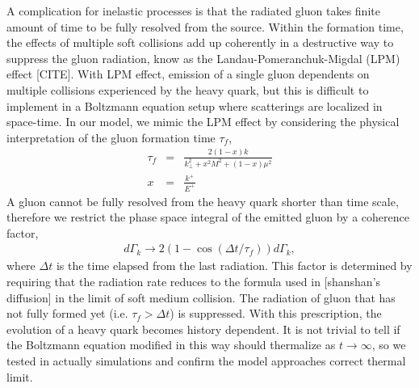 \documentclass[aps, prc, reprint, amsmath, groupedaddress, nofootinbib]{revtex4-1}
\begin{document}
A complication for inelastic processes is that the radiated gluon takes finite amount of time to be fully resolved from the source. 
Within the formation time, the effects of multiple soft collisions add up  coherently in a destructive way to suppress the gluon radiation, know as the Landau-Pomeranchuk-Migdal (LPM) effect [CITE].
With LPM effect, emission of a single gluon dependents on multiple collisions experienced by the heavy quark, but this is difficult to implement in a Boltzmann equation setup where scatterings are localized in space-time.
In our model, we mimic the LPM effect by considering the physical interpretation of the gluon formation time $\tau_f$,
\begin{eqnarray}
\tau_f &=& \frac{2(1-x)k}{k_\perp^2 + x^2M^2 + (1-x)\mu^2} \\
x &=& \frac{k^+}{E^+}
\end{eqnarray}
A gluon cannot be fully resolved from the heavy quark shorter than time scale, therefore we restrict the phase space integral of the emitted gluon   by a coherence factor,
\begin{eqnarray}
d\Gamma_k \rightarrow 2\left(1 - \cos\left(\Delta t/\tau_f\right) \right)d\Gamma_k,
\end{eqnarray}
where $\Delta t$ is the time elapsed from the last radiation. 
This factor is determined by requiring that the radiation rate reduces to the formula used in [shanshan's diffusion] in the limit of soft medium collision.
The radiation of gluon that has not fully formed yet (i.e. $\tau_f > \Delta t$) is suppressed.
With this prescription, the evolution of a heavy quark becomes history dependent. 
It is not trivial to tell if the Boltzmann equation modified in this way should thermalize as $t\rightarrow \infty$, so we tested in actually simulations and confirm the model approaches correct thermal limit.
\end{document}
